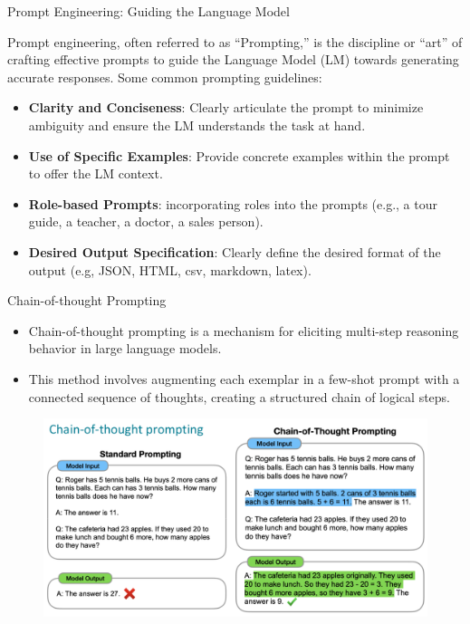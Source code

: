 \documentclass[handout]{beamer}
\begin{document}
\begin{frame}{Prompt Engineering: Guiding the Language Model}
\begin{scriptsize}
Prompt engineering, often referred to as ``Prompting,'' is the discipline or ``art'' of crafting effective prompts to guide the Language Model (LM) towards generating accurate responses. Some common prompting guidelines: \vspace{0.5cm}

\begin{itemize}
\item \textbf{Clarity and Conciseness}: Clearly articulate the prompt to minimize ambiguity and ensure the LM understands the task at hand.
\item \textbf{Use of Specific Examples}: Provide concrete examples within the prompt to offer the LM context.
\item \textbf{Role-based Prompts}: incorporating roles into the prompts (e.g., a tour guide, a teacher, a doctor, a sales person).
\item \textbf{Desired Output Specification}: Clearly define the desired format of the output (e.g, JSON, HTML, csv, markdown, latex).
\end{itemize}
\end{scriptsize}
\end{frame}


\begin{frame}{Chain-of-thought Prompting}

\begin{scriptsize}
\begin{itemize}
\item Chain-of-thought prompting is a mechanism for eliciting multi-step reasoning behavior in large language models.
\item  This method involves augmenting each exemplar in a few-shot prompt with a connected sequence of thoughts, creating a structured chain of logical steps. \cite{wei2022chain}
\end{itemize}
\end{scriptsize}



 \begin{figure}[h]
        	\includegraphics[scale = 0.3]{pics/chainoftought.png}
        \end{figure}



\end{frame}
\end{document}
